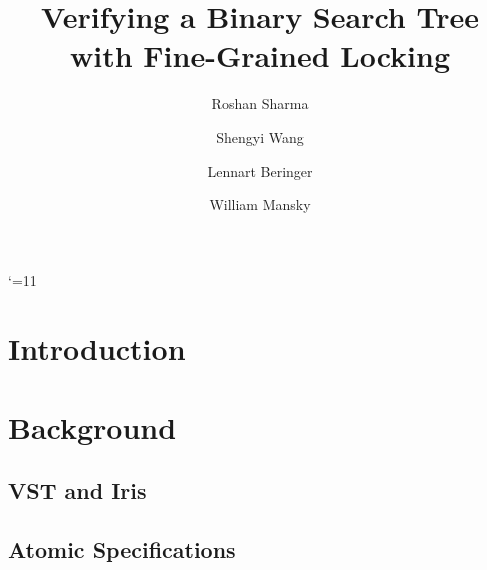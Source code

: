 \documentclass[acmsmall,screen]{acmart}\settopmatter{printfolios=true}
\title{Verifying a Binary Search Tree with Fine-Grained Locking}
\author{Roshan Sharma}
\author{Shengyi Wang}
\author{Lennart Beringer}
\author{William Mansky}
\date{} %
\begin{document}
\maketitle

\catcode`\@=11
\section{Introduction}

\section{Background}
\subsection{VST and Iris}
\subsection{Atomic Specifications}
\end{document}
